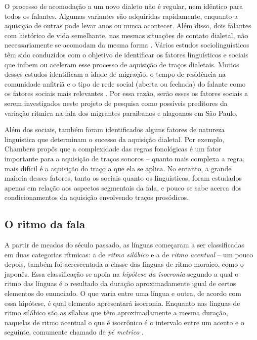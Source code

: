 \documentclass[a4paper, 12pt, article, oneside, brazil,leqno]{memoir}
\begin{document}
O processo de acomodação a um novo dialeto não é regular, nem idêntico para todos os falantes. Algumas variantes são adquiridas rapidamente, enquanto a aquisição de outras pode levar anos ou nunca acontecer. Além disso, dois falantes com histórico de vida semelhante, nas mesmas situações de contato dialetal, não necessariamente se acomodam da mesma forma \cite{trudgill1986}. Vários estudos sociolinguísticos têm sido conduzidos com o objetivo de identificar os fatores linguísticos e sociais que inibem ou aceleram esse processo de aquisição de traços dialetais. Muitos desses estudos identificam a idade de migração, o tempo de residência na comunidade anfitriã e o tipo de rede social (aberta ou fechada) do falante como os fatores sociais mais relevantes \cite{siegel2010}. Por essa razão, serão esses os fatores sociais a serem investigados neste projeto de pesquisa como possíveis preditores da variação rítmica na fala dos migrantes paraibanos e alagoanos em São Paulo.

Além dos sociais, também foram identificados alguns fatores de natureza linguística que determinam o sucesso da aquisição dialetal. Por exemplo, Chambers \citeyear{chambers1992} propôs que a complexidade das regras fonológicas é um fator importante para a aquisição de traços sonoros -- quanto mais complexa a regra, mais difícil é a aquisição do traço a que ela se aplica. No entanto, a grande maioria desses fatores, tanto os sociais quanto os linguísticos, foram estudados apenas em relação aos aspectos segmentais da fala, e pouco se sabe acerca dos condicionamentos da aquisição envolvendo traços prosódicos.

\subsection{O ritmo da fala}

A partir de meados do século passado, as línguas começaram a ser classificadas em duas categorias rítmicas: a de \emph{ritmo silábico} e a de \emph{ritmo acentual} -- um pouco depois, também foi acrescentada a classe das línguas de ritmo moraico, como o japonês. Essa classificação se apoia na \emph{hipótese da isocronia} segundo a qual o ritmo das línguas é o resultado da duração aproximadamente igual de certos elementos do enunciado. O que varia entre uma língua e outra, de acordo com essa hipótese, é qual elemento apresentará isocronia. Enquanto nas línguas de ritmo silábico são as sílabas que têm aproximadamente a mesma duração, naquelas de ritmo acentual o que é isocrônico é o intervalo entre um acento e o seguinte, comumente chamado de \emph{pé metrico} \cite{fuchs2016}.
\end{document}
